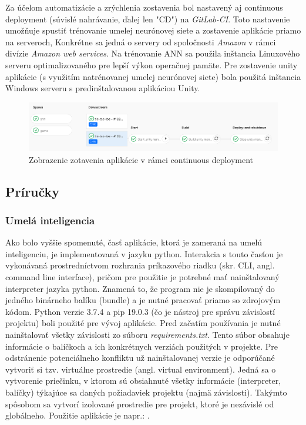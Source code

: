 Za účelom automatizácie a zrýchlenia zostavenia bol nastavený aj continuous deployment (súvislé nahrávanie, ďalej len
"CD") na \emph{GitLab-CI}.
Toto nastavenie umožňuje spustiť trénovanie umelej neurónovej siete a zostavenie aplikácie priamo na serveroch,
Konkrétne sa jedná o servery od spoločnosti \emph{Amazon} v rámci divízie \emph{Amazon web services}.
Na trénovanie ANN sa použila inštancia Linuxového serveru optimalizovaného pre lepší výkon operačnej pamäte.
Pre zostavenie unity aplikácie (s využitím natrénovanej umelej neurónovej siete) bola použitá inštancia Windows
serveru s predinštalovanou aplikáciou Unity.
\begin{figure}[H]
    \centering
    \includegraphics[width=1\textwidth]{images/impl-cd.png}
    \caption{Zobrazenie zotavenia aplikácie v rámci continuous deployment}
\end{figure}\label{figure:cd}

\subsection{Príručky}\label{subsec:helpers}
\subsubsection{Umelá inteligencia}
Ako bolo vyššie spomenuté, časť aplikácie, ktorá je zameraná na umelú inteligenciu, je implementovaná v jazyku python.
Interakcia s touto časťou je vykonávaná prostredníctvom rozhrania príkazového riadku (skr. CLI, angl. command line
interface), pričom pre použitie je potrebné mať nainštalovaný interpreter jazyka python.
Znamená to, že program nie je skompilovaný do jedného binárneho balíku (bundle) a je nutné pracovať priamo so zdrojovým
kódom.
Python verzie 3.7.4 a pip 19.0.3 (čo je nástroj pre správu závislostí projektu) boli použité pre vývoj aplikácie.
Pred začatím používania je nutné nainštalovať všetky závislosti zo súboru \emph{requirements.txt}.
Tento súbor obsahuje informácie o balíčkoch a ich konkrétnych verziách použitých v projekte.
Pre odstránenie potenciálneho konfliktu už nainštalovanej verzie je odporúčané vytvoriť si tzv. virtuálne prostredie
(angl. virtual environment).
Jedná sa o vytvorenie priečinku, v ktorom sú obsiahnuté všetky informácie (interpreter, balíčky) týkajúce sa daných
požiadaviek projektu (najmä závislosti).
Takýmto spôsobom sa vytvorí izolované prostredie pre projekt, ktoré je nezávislé od globálneho.
Použitie aplikácie je napr.: .

